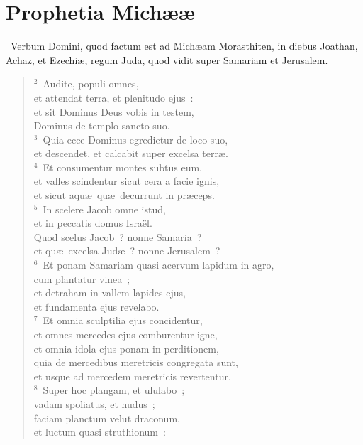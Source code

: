 \clearpage
{\centering \section*{Prophetia Michææ}}\thispagestyle{empty}

~Verbum Domini, quod factum est ad Mich\ae am Morasthiten, in diebus Joathan, Achaz, et Ezechi\ae , regum Juda, quod vidit super Samariam et Jerusalem.


\begin{flushleft}\begin{verse}\vspace{6pt}${}^{2}$~Audite, populi omnes,\\ et attendat terra, et plenitudo ejus~:\\ et sit Dominus Deus vobis in testem,\\ Dominus de templo sancto suo.\\
${}^{3}$~Quia ecce Dominus egredietur de loco suo,\\ et descendet, et calcabit super excelsa terr\ae .\\
${}^{4}$~Et consumentur montes subtus eum,\\ et valles scindentur sicut cera a facie ignis,\\ et sicut aqu\ae\ qu\ae\ decurrunt in pr\ae ceps.\\
${}^{5}$~In scelere Jacob omne istud,\\ et in peccatis domus Isra\"el.\\ Quod scelus Jacob~? nonne Samaria~?\\ et qu\ae\ excelsa Jud\ae~? nonne Jerusalem~?\\
${}^{6}$~Et ponam Samariam quasi acervum lapidum in agro,\\ cum plantatur vinea~;\\ et detraham in vallem lapides ejus,\\ et fundamenta ejus revelabo.\\
${}^{7}$~Et omnia sculptilia ejus concidentur,\\ et omnes mercedes ejus comburentur igne,\\ et omnia idola ejus ponam in perditionem,\\ quia de mercedibus meretricis congregata sunt,\\ et usque ad mercedem meretricis revertentur.\\
${}^{8}$~Super hoc plangam, et ululabo~;\\ vadam spoliatus, et nudus~;\\ faciam planctum velut draconum,\\ et luctum quasi struthionum~:\\

\end{verse}
\end{flushleft}
